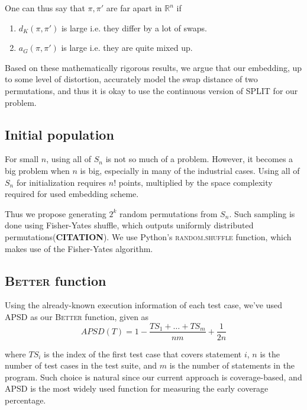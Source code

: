 \documentclass[10pt,journal,compsoc]{IEEEtran}
\begin{document}
	One can thus say that $\pi, \pi'$ are far apart in $\mathbb{R}^n$ if 
	\begin{enumerate}
		\item $d_K(\pi, \pi')$ is large i.e. they differ by a lot of swaps.
		\item $a_G(\pi, \pi')$ is large i.e. they are quite mixed up.
	\end{enumerate}
	
	Based on these mathematically rigorous results, we argue that our embedding, up to some level of distortion, accurately model the swap distance of two permutations, and thus it is okay to use the continuous version of SPLIT for our problem.
	
	
	\subsection{Initial population}
	For small $n$, using all of $S_n$ is not so much of a problem.
	However, it becomes a big problem when $n$ is big, especially in many of the industrial cases.
	Using all of $S_n$ for initialization requires $n!$ points, multiplied by the space complexity required for used embedding scheme.
	
	Thus we propose generating $2^k$ random permutations from $S_n$.
	Such sampling is done using Fisher-Yates shuffle, which outputs uniformly distributed permutations\cite{}({\bf CITATION}).
	We use Python's \textsc{random.shuffle} function, which makes use of the Fisher-Yates algorithm.
	
	
	\subsection{\textsc{Better} function}\label{sec:better}
	Using the already-known execution information of each test case, we've used APSD\cite{RYCC01} as our \textsc{Better} function, given as
	\begin{equation}
		\label{eq:apsd}
		APSD(T) = 1 - \frac{TS_1 + \dots + TS_m}{nm} + \frac{1}{2n}
	\end{equation}
	
	where $TS_i$ is the index of the first test case that covers statement $i$, $n$ is the number of test cases in the test suite, and $m$ is the number of statements in the program. 
	Such choice is natural since our current approach is coverage-based, and APSD is the most widely used function for measuring the early coverage percentage.
	
	
	
\end{document}
